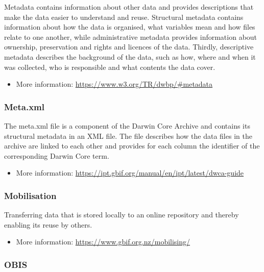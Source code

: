 \documentclass[
  oneside]{book}
\providecommand{\tightlist}{%
  \setlength{\itemsep}{0pt}\setlength{\parskip}{0pt}}
\begin{document}
Metadata contains information about other data and provides descriptions that make the data easier to understand and reuse. Structural metadata contains information about how the data is organised, what variables mean and how files relate to one another, while administrative metadata provides information about ownership, preservation and rights and licences of the data. Thirdly, descriptive metadata describes the background of the data, such as how, where and when it was collected, who is responsible and what contents the data cover.

\begin{itemize}
\tightlist
\item
  More information: \url{https://www.w3.org/TR/dwbp/\#metadata}
\end{itemize}

\subsubsection*{Meta.xml}\label{metaxml}

The meta.xml file is a component of the Darwin Core Archive and contains its structural metadata in an XML file. The file describes how the data files in the archive are linked to each other and provides for each column the identifier of the corresponding Darwin Core term.

\begin{itemize}
\tightlist
\item
  More information: \url{https://ipt.gbif.org/manual/en/ipt/latest/dwca-guide}
\end{itemize}

\subsubsection*{Mobilisation}\label{mobilisation}

Transferring data that is stored locally to an online repository and thereby enabling its reuse by others.

\begin{itemize}
\tightlist
\item
  More information: \url{https://www.gbif.org.nz/mobilising/}
\end{itemize}

\subsubsection*{OBIS}\label{OBIS}
\end{document}
